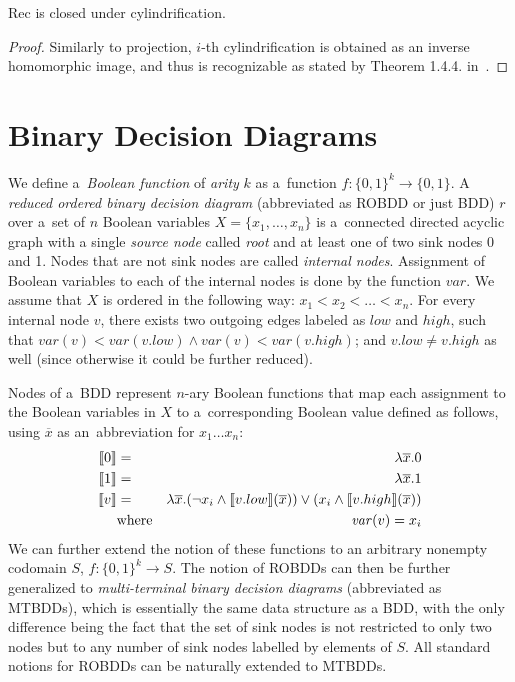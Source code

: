 \begin{lemma}
Rec is closed under cylindrification.
\end{lemma}

\begin{proof}
 Similarly to projection, $i$-th cylindrification is obtained as an inverse
 homomorphic image, and thus is recognizable as stated by Theorem 1.4.4. in~\cite{tata}.
\end{proof}

 \section{Binary Decision Diagrams}\label{bdd}

We define a~\emph{Boolean function} of \emph{arity} $k$ as a~function $f :
\{0,1\}^k \to \{0,1\}$. A \emph{reduced ordered binary decision
diagram} (abbreviated as ROBDD or just BDD) $r$ over a~set of $n$ Boolean
variables $X = \{x_1,\ldots,x_n\}$ is a~connected directed acyclic graph with a
single \emph{source node} called \emph{root} and at least one of two sink nodes
0 and 1. Nodes that are not sink nodes are called \emph{internal nodes}.
Assignment of Boolean variables to each of the internal nodes is done by the
function $\mathit{var}$. We assume that $X$ is ordered in the following way:
$x_1 < x_2 < \ldots < x_n$.
For every internal node $v$, there exists two outgoing edges labeled as $low$
and $\mathit{high}$, such that $\mathit{var}(v) < \mathit{var}(v.low) \wedge \mathit{var}(v) <
\mathit{var}(v.high)$; and $v.low \neq v.high$ as well (since otherwise it could be further reduced).

Nodes of a~BDD represent $n$-ary Boolean functions that map each assignment to
the Boolean variables in $X$ to a~corresponding Boolean value defined as
follows, using $\overline{x}$ as an~abbreviation for $x_1\ldots x_n$:
\begin{eqnarray*}
 \text{\textlbrackdbl} 0\text{\textrbrackdbl} & = & \lambda\overline{x}.0\\
 \text{\textlbrackdbl} 1\text{\textrbrackdbl} & = & \lambda\overline{x}.1\\
 \text{\textlbrackdbl} v\text{\textrbrackdbl} & = & \lambda\overline{x}.(\neg
 x_i \wedge \text{\textlbrackdbl} v.low\text{\textrbrackdbl}(\overline{x})) \vee
 (x_i \wedge \text{\textlbrackdbl} v.high\text{\textrbrackdbl}(\overline{x}))\\
       & \text{where} & \mathit{var}(v) = x_i
\end{eqnarray*}
We can further extend the notion of these functions to an arbitrary nonempty
codomain $S$, $f : \{0,1\}^k \longrightarrow
S$.
The notion of ROBDDs can then be further generalized to \emph{multi-terminal
binary decision diagrams} (abbreviated as MTBDDs), which is essentially the same data
structure as a BDD, with the only difference being the fact that the set of
sink nodes is not restricted to only two nodes but to any number of sink nodes
labelled by elements of $S$. All standard notions for ROBDDs can be naturally
extended to MTBDDs.

